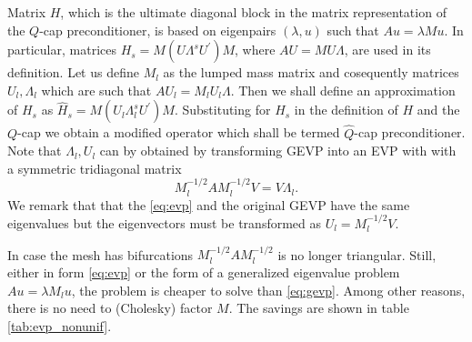 \documentclass[10pt, a4paper]{article}
\newcommand{\dual}[1]{\ensuremath{{#1}^{\prime}}}
\begin{document}
Matrix $H$, which is the ultimate diagonal block in the matrix representation of
the $Q$-cap preconditioner, is based on eigenpairs $(\lambda, u)$ such that 
$Au=\lambda M u$. In particular, matrices $H_s=M(U\Lambda^s \dual{U})M$, where
$AU=MU\Lambda$, are used in its definition. Let us define $M_l$ as the lumped
mass matrix and cosequently matrices $U_l, \Lambda_l$ which are such that
$AU_l=M_l U_l\Lambda$. Then we shall define an approximation of $H_s$ as
$\hat{H}_s=M(U_l\Lambda^s_l\dual{U})M$. Substituting for $H_s$ in the definition
of $H$ and the $Q$-cap we obtain a modified operator which shall be termed 
$\hat{Q}$-cap preconditioner.
Note that $\Lambda_l, U_l$ can by obtained by transforming GEVP into an EVP with 
with a symmetric tridiagonal matrix
\begin{equation}\label{eq:evp}
  M_l^{-1/2}A M_l^{-1/2} V=V\Lambda_l.
\end{equation}
We remark that that the \eqref{eq:evp} and the original GEVP have the same
eigenvalues but the eigenvectors must be transformed as $U_l=M_l^{-1/2} V$.

In case the mesh has bifurcations $M_l^{-1/2}A M_l^{-1/2}$ is no longer 
triangular. Still, either in form \eqref{eq:evp} or the form of a
generalized eigenvalue problem $Au=\lambda M_l u$, the problem is cheaper to
solve than \eqref{eq:gevp}. Among other reasons, there is no need to (Cholesky) 
factor $M$. The savings are shown in table \ref{tab:evp_nonunif}.
\end{document}
